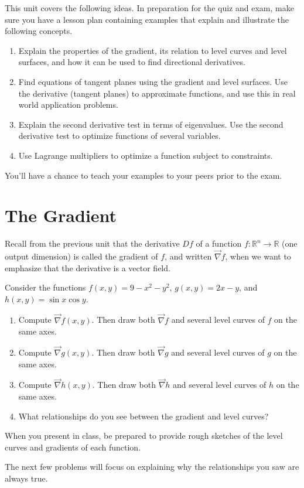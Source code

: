
\noindent 
This unit covers the following ideas. In preparation for the quiz and exam, make sure you have a lesson plan containing examples that explain and illustrate the following concepts.  
\begin{enumerate}
\item Explain the properties of the gradient, its relation to level curves and level surfaces, and how it can be used to find directional derivatives.
\item Find equations of tangent planes using the gradient and level surfaces. Use the derivative (tangent planes) to approximate functions, and use this in real world application problems.
\item Explain the second derivative test in terms of eigenvalues. Use the second derivative test to optimize functions of several variables.
\item Use Lagrange multipliers to optimize a function subject to constraints. %
\end{enumerate}
You'll have a chance to teach your examples to your peers prior to the exam.



\section{The Gradient}

Recall from the previous unit that the derivative $Df$ of a function $f:\mathbb{R}^n\to\mathbb{R}$ (one output dimension) is called the gradient of $f$, and written $\vec \nabla f$, when we want to emphasize that the derivative is a vector field.  

\begin{problem}
 Consider the functions 
$f(x,y)=9-x^2-y^2$, 
$g(x,y)=2x-y$, and 
$h(x,y)=\sin x\cos y$. 
\begin{enumerate}
 \item Compute $\vec \nabla f(x,y)$.  Then draw both $\vec \nabla f$ and several level curves of $f$ on the same axes.
 \item Compute $\vec \nabla g(x,y)$.  Then draw both $\vec \nabla g$ and several level curves of $g$ on the same axes.
 \item Compute $\vec \nabla h(x,y)$.  Then draw both $\vec \nabla h$ and several level curves of $h$ on the same axes. 
 \item What relationships do you see between the gradient and level curves? 
\end{enumerate}
When you present in class, be prepared to provide rough sketches of the level curves and gradients of each function.
\end{problem}
The next few problems will focus on explaining why the relationships you saw are always true.

